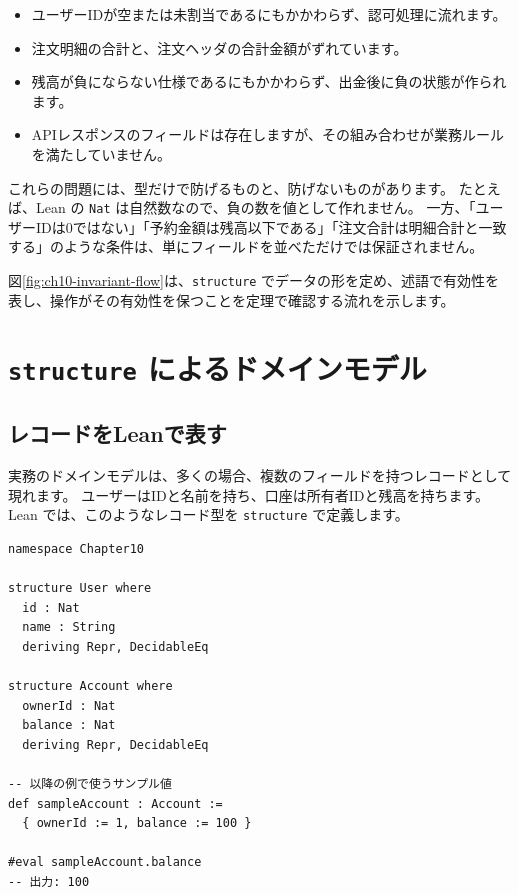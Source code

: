 \begin{itemize}
\item ユーザーIDが空または未割当であるにもかかわらず、認可処理に流れます。
\item 注文明細の合計と、注文ヘッダの合計金額がずれています。
\item 残高が負にならない仕様であるにもかかわらず、出金後に負の状態が作られます。
\item APIレスポンスのフィールドは存在しますが、その組み合わせが業務ルールを満たしていません。
\end{itemize}

これらの問題には、型だけで防げるものと、防げないものがあります。
たとえば、Lean の \texttt{Nat} は自然数なので、負の数を値として作れません。
一方、「ユーザーIDは0ではない」「予約金額は残高以下である」「注文合計は明細合計と一致する」のような条件は、単にフィールドを並べただけでは保証されません。

図\ref{fig:ch10-invariant-flow}は、\texttt{structure} でデータの形を定め、述語で有効性を表し、操作がその有効性を保つことを定理で確認する流れを示します。


\section{\texttt{structure} によるドメインモデル}

\subsection{レコードをLeanで表す}

実務のドメインモデルは、多くの場合、複数のフィールドを持つレコードとして現れます。
ユーザーはIDと名前を持ち、口座は所有者IDと残高を持ちます。
Lean では、このようなレコード型を \texttt{structure} で定義します。

\begin{listing}[htbp]
\begin{verbatim}
namespace Chapter10

structure User where
  id : Nat
  name : String
  deriving Repr, DecidableEq

structure Account where
  ownerId : Nat
  balance : Nat
  deriving Repr, DecidableEq

-- 以降の例で使うサンプル値
def sampleAccount : Account :=
  { ownerId := 1, balance := 100 }

#eval sampleAccount.balance
-- 出力: 100
\end{verbatim}
\caption{\texttt{User} と \texttt{Account}}
\label{lst:ch10_structure_model}
\end{listing}

